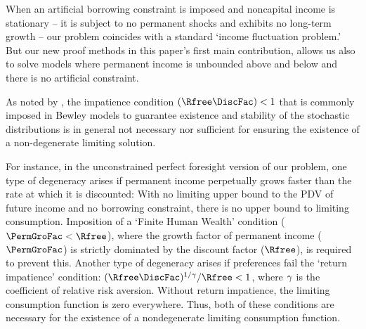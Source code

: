 \documentclass[BufferStockTheory]{subfiles}
\begin{document}


\newcommand{\APFacRaw}{(\Rfree\DiscFac)^{1/\CRRA}}
When an artificial borrowing constraint is imposed and noncapital income is stationary -- it is subject to no permanent shocks and exhibits no long-term growth %
-- our problem coincides with a standard `income fluctuation problem.' But our new proof methods in this paper's first main contribution, allows us also to solve models where permanent income is unbounded above and below and there is no artificial constraint.

As noted by \cite{szeidlInvariant}, the impatience condition $(\Rfree \DiscFac) < 1$ that is commonly imposed in Bewley models to guarantee existence and stability of the stochastic distributions is in general not necessary nor sufficient for ensuring the existence of a non-degenerate limiting solution.

For instance, in the unconstrained perfect foresight version of our problem, one type of degeneracy arises if permanent income perpetually grows faster than the rate at which it is discounted: With no limiting upper bound to the PDV of future income and no borrowing constraint, there is no upper bound to limiting consumption. Imposition of a `Finite Human Wealth' condition ($\PermGroFac < \Rfree$), where the growth factor of permanent income ($\PermGroFac$) is strictly dominated by the discount factor ($\Rfree$), is required to prevent this. Another type of degeneracy arises if preferences fail the `return impatience' condition: $\APFacRaw/\Rfree < 1$, where $\gamma$ is the coefficient of relative risk aversion. Without return impatience, the limiting consumption function is zero everywhere. Thus, both of these conditions are necessary for the existence of a nondegenerate limiting consumption function.

\end{document}
